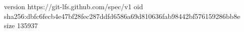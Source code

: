 version https://git-lfs.github.com/spec/v1
oid sha256:dbfc6fecb4e47bf28fec287ddfd6586a69d810636fab98442bf576159286bb8e
size 135937
